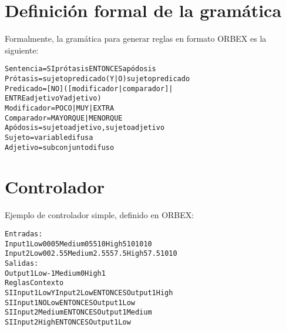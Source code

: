 \section{Definición formal de la gramática}
\label{ape:gramatica}

Formalmente, la gramática para generar reglas en formato \gls{ORBEX} es la siguiente:

\begin{alltt}
Sentencia = SI prótasis ENTONCES apódosis
Prótasis = sujeto predicado {(Y | O) sujeto predicado }
Predicado = [ NO ] ( [ modificador | comparador ]  |
              ENTRE adjetivo Y  adjetivo )
Modificador = POCO | MUY | EXTRA
Comparador =  MAYORQUE | MENORQUE
Apódosis = sujeto adjetivo { , sujeto adjetivo }
Sujeto = variable difusa
Adjetivo = subconjunto difuso
\end{alltt}


\section{Controlador}
\label{ape:orbex}

Ejemplo de controlador simple, definido en ORBEX:\\

\begin{alltt}
Entradas:
    Input1 {Low 0 0 0 5 Medium 0 5 5 10 High 5 10 10 10}
    Input2 {Low 0 0 2.5 5 Medium 2.5 5 5 7.5 High 5 7.5 10 10}
Salidas:
   Output1 {Low -1 Medium 0 High 1}
Reglas Contexto
    SI Input1 Low Y Input2 Low ENTONCES Output1 High
    SI Input1 NO Low ENTONCES Output1 Low
    SI Input2 Medium ENTONCES Output1 Medium
    SI Input2 High ENTONCES Output1 Low
\end{alltt}




